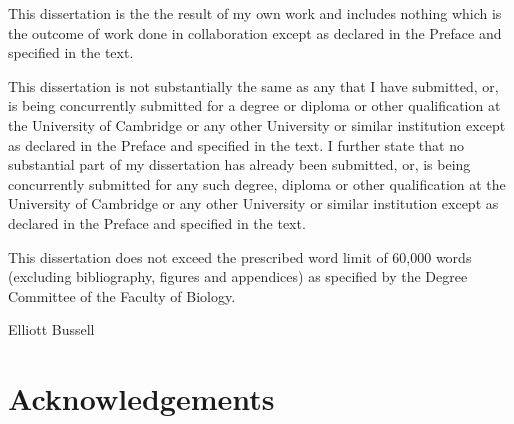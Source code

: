 This dissertation is the the result of my own work and includes nothing which is the outcome
of work done in collaboration except as declared in the Preface and specified in the text.

This dissertation is not substantially the same as any that I have submitted, or, is being
concurrently submitted for a degree or diploma or other qualification at the University of
Cambridge or any other University or similar institution except as declared in the Preface and
specified in the text. I further state that no substantial part of my dissertation has already
been submitted, or, is being concurrently submitted for any such degree, diploma or other
qualification at the University of Cambridge or any other University or similar institution
except as declared in the Preface and specified in the text.

This dissertation does not exceed the prescribed word limit of 60,000 words (excluding
bibliography, figures and appendices) as specified by the Degree Committee of the Faculty
of Biology.

\vspace*{2cm}

Elliott Bussell

\thesisDate
\cleardoublepage

\chapter*{Acknowledgements}
\label{sec:acknowledgements}
\vspace*{-10mm}

\blindtext
